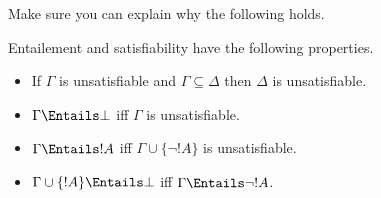 \documentclass[../../../../include/open-logic-section]{subfiles}
\begin{document}
Make sure you can explain why the following holds.

\begin{prop}
    Entailement and satisfiability have the following properties.
    \begin{itemize}
    \item If $\Gamma$ is unsatisfiable and $\Gamma\subseteq\Delta$ then 
    $\Delta$ is unsatisfiable.
    \item $\Gamma \Entails \bot$ iff $\Gamma$ is unsatisfiable.
    \item $\Gamma \Entails !A$ iff $\Gamma \cup \{\lnot !A\}$ is unsatisfiable.
    \item $\Gamma \cup \{!A\} \Entails \bot$ iff $\Gamma \Entails \lnot !A$.
    \end{itemize}
\end{prop}
\end{document}
